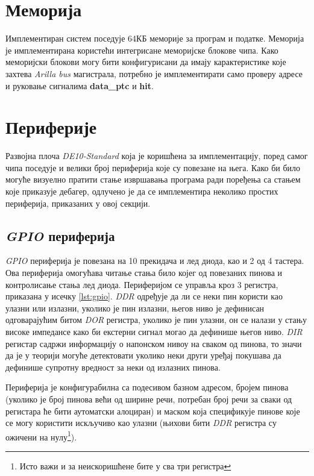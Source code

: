 \section{Меморија}

Имплементиран систем поседује 64КБ меморије за програм и податке. Меморија је имплементирана користећи интегрисане меморијске блокове  чипа. Како меморијски блокови могу бити конфигурисани да имају карактеристике које захтева \textit{Arilla bus} магистрала, потребно је имплементирати само проверу адресе и руковање сигналима \textbf{data\_ptc} и \textbf{hit}.

\section{Периферије}

Развојна плоча \textit{DE10-Standard} \cite{de10} која је коришћена за имплементацију, поред самог  чипа поседује и велики број периферија које су повезане на њега. Како би било могуће визуелно пратити стање извршавања програма ради поређења са стањем које приказује дебагер, одлучено је да се имплементира неколико простих периферија, приказаних у овој секцији.

\subsection{\textit{\acrshort{GPIO}} периферија}

\textit{\acrfull{GPIO}} периферија је повезана на 10 прекидача и лед диода, као и 2 од 4 тастера. Ова периферија омогућава читање стања било којег од повезаних пинова и контролисање стања лед диода. Периферијом се управља кроз 3 регистра, приказана у исечку \ref{lst:gpio}. \textit{\acrfull{DDR}} одређује да ли се неки пин користи као улазни или излазни, уколико је пин излазни, његов ниво је дефинисан одговарајућим битом \textit{\acrfull{DOR}} регистра, уколико је пин улазни, он се налази у стању високе импедансе како би екстерни сигнал могао да дефинише његов ниво. \textit{\acrfull{DIR}} регистар садржи информацију о напонском нивоу на сваком од пинова, то значи да је у теорији могуће детектовати уколико неки други уређај покушава да дефинише супротну вредност за неки од излазних пинова.



Периферија је конфигурабилна са подесивом базном адресом, бројем пинова (уколико је број пинова већи од ширине речи, потребан број речи за сваки од регистара ће бити аутоматски алоциран) и маском која спецификује пинове које се могу користити искључиво као улазни (њихови бити \textit{\acrshort{DDR}} регистра су ожичени на нулу\footnote{Исто важи и за неискоришћене бите у сва три регистра}).

